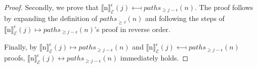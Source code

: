 \begin{proof}
  Secondly, we prove that ${\llbracket \text{n} \rrbracket}^{\epsilon}_{\mathcal{E}}(j) \longmapsfrom paths_{\ge j - \epsilon}(n)$. The proof follows by expanding the definition of ${paths}_{\ge \tau}(n)$ and following the steps of ${\llbracket \text{n} \rrbracket}^{\epsilon}_{\mathcal{E}}(j) \longmapsto paths_{\ge j - \epsilon}(n)$'s proof in reverse order.

  Finally, by ${\llbracket \text{n} \rrbracket}^{\epsilon}_{\mathcal{E}}(j) \longmapsto paths_{\ge j - \epsilon}(n)$ and ${\llbracket \text{n} \rrbracket}^{\epsilon}_{\mathcal{E}}(j) \longmapsfrom paths_{\ge j - \epsilon}(n)$ proofs, ${\llbracket \text{n} \rrbracket}^{\epsilon}_{\mathcal{E}}(j) \longleftrightarrow paths_{\ge j - \epsilon}(n)$ immediately holds.

\end{proof}





